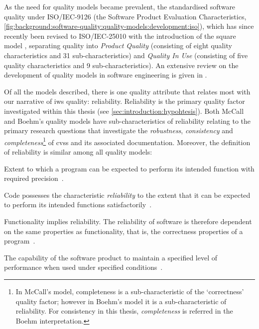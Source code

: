 As the need for quality models became prevalent, the \citeauthor{ISO9126:1999} standardised software quality under ISO/IEC-9126 \citep{ISO9126:1999} (the Software Product Evaluation Characteristics, \cref{fig:background:software-quality:quality-models:development:iso}), which has since recently been revised to ISO/IEC-25010 with the introduction of the \gls{square} model \citep{ISO25010:2011}, separating quality into \textit{Product Quality} (consisting of eight quality characteristics and 31 sub-characteristics) and \textit{Quality In Use} (consisting of five quality characteristics and 9 sub-characteristics).
An extensive review on the development of quality models in software engineering is given in \citep{AlQutaish:2010vua}.

Of all the models described, there is one quality attribute that relates most with our narrative of \gls{iws} quality: reliability. Reliability is the primary quality factor investigated within this thesis (see \cref{sec:introduction:hypohtesis}). Both McCall and Boehm's quality models have sub-characteristics of reliability relating to the primary research questions that investigate the \textit{robustness}, \textit{consistency} and \textit{completeness}\footnote{In McCall's model, completeness is a sub-characteristic of the `correctness' quality factor; however in Boehm's model it is a sub-characteristic of reliability. For consistency in this thesis, \textit{completeness} is referred in the Boehm interpretation.} of  \glspl{cvs} and its associated documentation. Moreover, the definition of reliability is similar among all quality models:

\begin{description}[font=\itshape,style=multiline,leftmargin=3cm]
  \item[\citeauthor{McCall:1977uy}] Extent to which a program can be expected to perform its intended function with required precision~\citep{McCall:1977uy}.
  \item[\citeauthor{Boehm:1978vv}] Code possesses the characteristic \textit{reliability} to the extent that it can be expected to perform its intended functions satisfactorily~\citep{Boehm:1978vv}.
  \item[\citeauthor{Dromey:1995wy}] Functionality implies reliability. The reliability of software is therefore  dependent on the same properties as functionality, that is, the correctness properties of a program~\citep{Dromey:1995wy}.
  \item[ISO/IEC-9126] The capability of the software product to maintain a specified level of performance when used under specified conditions~\citep{ISO9126:1999}.
\end{description}

